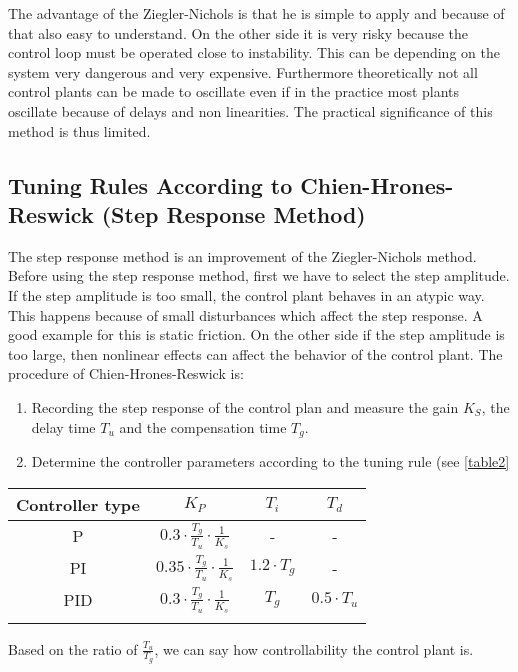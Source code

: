 The advantage of the Ziegler-Nichols is that he is simple to apply and because of that also easy to understand. On the other side it is very risky because the control loop must be operated close to instability. This can be depending on the system very dangerous and very expensive. Furthermore theoretically not all control plants can be made to oscillate even if in the practice most plants oscillate because of delays and non linearities. The practical significance of this method is thus limited.

\subsection{Tuning Rules According to Chien-Hrones-Reswick (Step Response Method)}
The step response method is an improvement of the Ziegler-Nichols method.
Before using the step response method, first we have to select the step amplitude.
If the step amplitude is too small, the control plant behaves in an atypic way. This happens because of small disturbances which affect the step response. A good example for this is static friction.
On the other side if the step amplitude is too large, then nonlinear effects can affect the behavior of the control plant.
The procedure of Chien-Hrones-Reswick is:
\begin{enumerate}
\item Recording the step response of the control plan and measure the gain $K_{S}$, the delay time $T_{u}$ and the compensation time $T_{g}$.
\item Determine the controller parameters according to the tuning rule (see \ref{table2}
\end{enumerate}

\begin{center}
\begin{tabular}{|c|c|c|c|}
\hline
Controller type & $K_{P}$ & $T_{i}$ & $T_{d}$ \\ \hline
P & $0.3 \cdot\frac{T_{g}}{T_{u}} \cdot \frac{1}{K_{s}}$ & - & - \\ \hline
PI & $0.35 \cdot\frac{T_{g}}{T_{u}} \cdot \frac{1}{K_{s}}$ & $1.2 \cdot T_{g}$  & - \\ \hline
PID & $0.3 \cdot\frac{T_{g}}{T_{u}} \cdot \frac{1}{K_{s}}$ & $T_{g}$ & $0.5 \cdot T_{u}$ \\\hline

	\label{table1}
\end{tabular}
\end{center}
Based on the ratio of $\frac{T_{u}}{T_{g}}$, we can say how controllability the control plant is.

